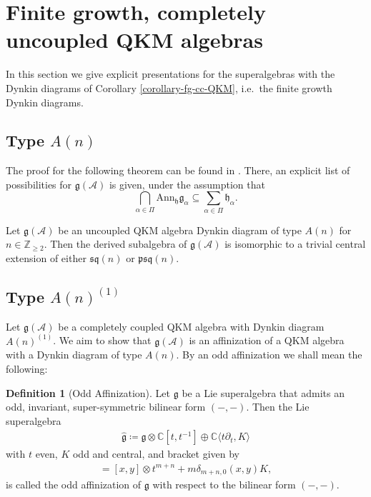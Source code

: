 \documentclass[12pt, a4paper, reqno]{amsart}
\def\AA{\mathcal{A}}
\def\p{\mathfrak{p}}
\def\q{\mathfrak{q}}
\def\g{\mathfrak{g}}
\def\s{\mathfrak{s}}
\theoremstyle{definition}
\newtheorem{definition}{Definition}
\theoremstyle{definition}
\theoremstyle{definition}
\numberwithin{theorem}{section}
\numberwithin{lemma}{section}
\numberwithin{remark}{section}
\numberwithin{definition}{section}
\numberwithin{corollary}{section}
\numberwithin{proposition}{section}
\numberwithin{example}{section}
\begin{document}
	

	
	
	\section{Finite growth, completely uncoupled QKM algebras}
	
	In this section we give explicit presentations for the superalgebras with the Dynkin diagrams of Corollary \ref{corollary-fg-cc-QKM}, i.e.~the finite growth Dynkin diagrams.
	
	\subsection{Type \(A(n)\)}\label{subsection-An}
	The proof for the following theorem can be found in \cite{Si}.   There, an explicit list of possibilities for $\g(\AA)$ is given, under the assumption that 
	\[
	\bigcap_{\alpha \in \Pi} \mathrm{Ann}_{\mathfrak{h}}\mathfrak{g}_{\alpha} \subseteq \sum_{\alpha\in \Pi} \mathfrak{h}_{\alpha}.
	\]
	\begin{theorem}\label{theorem-finite-dimensional-QKM}
		Let \(\mathfrak{g}(\mathcal{A})\) be an uncoupled QKM algebra Dynkin diagram of type \(A(n)\) for \(n \in \mathbb{Z}_{\geq 2}\).  Then the derived subalgebra of $\g(\AA)$ is isomorphic to a trivial central extension of either $\s\q(n)$ or $\p\s\q(n)$.  
	\end{theorem}
	
	\subsection{Type \({A(n)}^{(1)}\)}
	
	Let \(\mathfrak{g}(\mathcal{A})\) be a completely coupled QKM algebra with Dynkin diagram \({A(n)}^{(1)}\). We aim to show that \(\mathfrak{g}(\mathcal{A})\) is an affinization of a QKM algebra with a Dynkin diagram of type \(A(n)\). By an odd affinization we shall mean the following:
	
	\begin{definition}[Odd Affinization]
		Let \(\mathfrak{g}\) be a Lie superalgebra that admits an odd, invariant, super-symmetric bilinear form \((-,-)\). Then the Lie superalgebra
		\begin{align*}
			\hat{\mathfrak{g}} \coloneq \mathfrak{g}\otimes \mathbb{C}[t,t^{-1}] \oplus \mathbb{C}\langle t\partial_t, K  \rangle
		\end{align*}
		with \(t\) even, \(K\) odd and central, and bracket given by
		\begin{align*}
			[x\otimes t^m, y\otimes t^n] = [x,y]\otimes t^{m+n} + m \delta_{m+n,0} (x,y) K,
		\end{align*}
		is called the odd affinization of \(\mathfrak{g}\) with respect to the bilinear form \((-,-)\).
	\end{definition}
	
\end{document}
